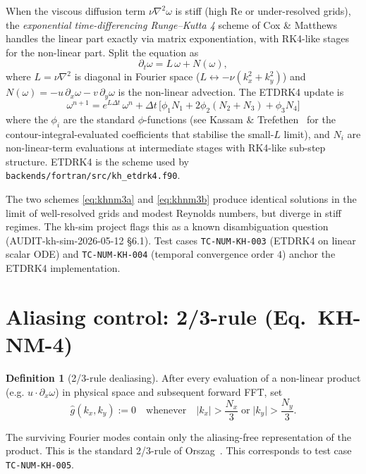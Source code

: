 \documentclass[11pt,a4paper]{article}
\theoremstyle{definition}
\newtheorem{definition}{Definition}
\theoremstyle{plain}
\begin{document}
When the viscous diffusion term $\nu\nabla^2\omega$ is stiff (high Re
or under-resolved grids), the \emph{exponential time-differencing
Runge--Kutta 4} scheme of Cox \& Matthews~\cite{CoxMatthews2002}
handles the linear part exactly via matrix exponentiation, with
RK4-like stages for the non-linear part. Split the equation as
\[
\partial_t \omega = L\,\omega + N(\omega),
\]
where $L = \nu\nabla^2$ is diagonal in Fourier space
($L \leftrightarrow -\nu(k_x^2 + k_y^2)$) and
$N(\omega) = -u\,\partial_x\omega - v\,\partial_y\omega$ is the
non-linear advection. The ETDRK4 update is
\begin{equation}
\label{eq:khnm3b}
\omega^{n+1} = e^{L\Delta t}\,\omega^n
+ \Delta t\,\bigl[\phi_1 N_1 + 2\phi_2(N_2 + N_3) + \phi_3 N_4\bigr]
\tag{KH-NM-3b}
\end{equation}
where the $\phi_i$ are the standard $\phi$-functions
(see Kassam \& Trefethen~\cite{KassamTrefethen2005} for the
contour-integral-evaluated coefficients that stabilise the small-$L$
limit), and $N_i$ are non-linear-term evaluations at intermediate
stages with RK4-like sub-step structure. ETDRK4 is the scheme used by
\texttt{backends/fortran/src/kh\_etdrk4.f90}.

The two schemes \eqref{eq:khnm3a} and \eqref{eq:khnm3b} produce
identical solutions in the limit of well-resolved grids and modest
Reynolds numbers, but diverge in stiff regimes. The kh-sim project
flags this as a known disambiguation question
(AUDIT-kh-sim-2026-05-12 §6.1). Test cases
\texttt{TC-NUM-KH-003} (ETDRK4 on linear scalar ODE) and
\texttt{TC-NUM-KH-004} (temporal convergence order $4$) anchor the
ETDRK4 implementation.

\section{Aliasing control: 2/3-rule (Eq.\ KH-NM-4)}

\begin{definition}[2/3-rule dealiasing]
After every evaluation of a non-linear product (e.g.
$u \cdot \partial_x \omega$) in physical space and subsequent
forward FFT, set
\begin{equation}
\label{eq:khnm4}
\hat g(k_x, k_y) := 0
\quad\text{whenever}\quad
\lvert k_x \rvert > \frac{N_x}{3} \;\text{or}\; \lvert k_y \rvert > \frac{N_y}{3}.
\tag{KH-NM-4}
\end{equation}
\end{definition}

The surviving Fourier modes contain only the aliasing-free
representation of the product. This is the standard 2/3-rule of
Orszag~\cite{Orszag1971}.
This corresponds to test case \texttt{TC-NUM-KH-005}.
\end{document}
